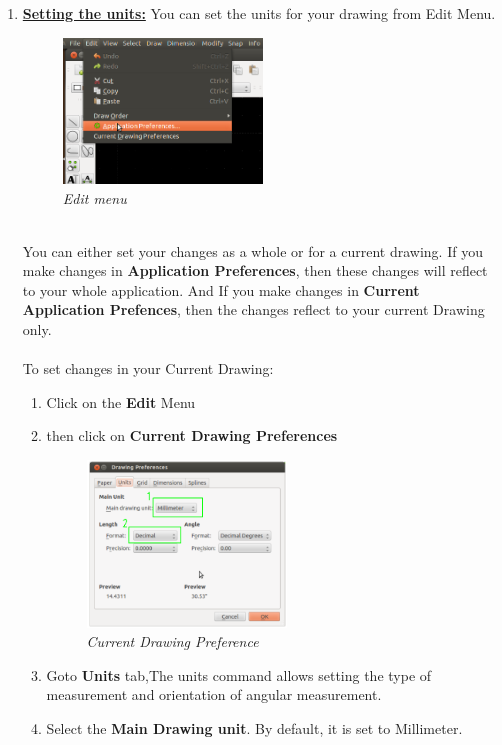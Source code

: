 \vspace{0.2in}  %
\begin{enumerate}
\item{\textbf{\underline{Setting the units:}}
You can set the units for your drawing from Edit Menu.
    \begin{figure}[h!]
    \centering\includegraphics[width=200px]{./images/edit.png}
    \caption{\small \sl Edit menu}
    \end{figure}\\
You can either set your changes as a whole or for a current drawing.
If you make changes in \textbf{Application Preferences}, then these changes will reflect to your whole application.
And If you make changes in \textbf{Current Application Prefences}, then the changes reflect to your current Drawing only.\\\\
To set changes in your Current Drawing:
    \begin{enumerate}
    \item{Click on the \textbf{Edit} Menu}
    \item{then click on \textbf{Current Drawing Preferences}}
       \begin{figure}[h!]
       \centering\includegraphics[width=200px]{./images/draw_pref.png}
       \caption{\small \sl Current Drawing Preference}
       \end{figure}
    \item{Goto \textbf{Units} tab,The units command allows setting the type of measurement and orientation of angular measurement.}
    \item{Select the \textbf{Main Drawing unit}. By default, it is set to Millimeter.}

\end{enumerate}}
\end{enumerate}
